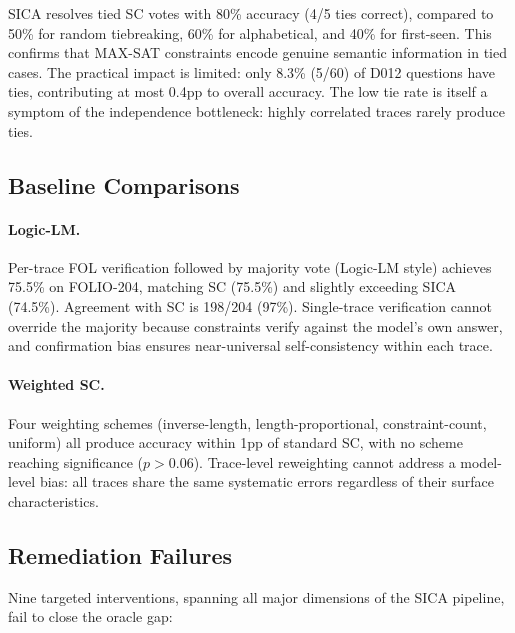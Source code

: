 \documentclass[11pt,a4paper]{article}
\begin{document}
SICA resolves tied SC votes with 80\% accuracy (4/5 ties correct), compared to 50\% for random tiebreaking, 60\% for alphabetical, and 40\% for first-seen. This confirms that MAX-SAT constraints encode genuine semantic information in tied cases. The practical impact is limited: only 8.3\% (5/60) of D012 questions have ties, contributing at most 0.4pp to overall accuracy. The low tie rate is itself a symptom of the independence bottleneck: highly correlated traces rarely produce ties.

\subsection{Baseline Comparisons}

\paragraph{Logic-LM.} Per-trace FOL verification followed by majority vote (Logic-LM style) achieves 75.5\% on FOLIO-204, matching SC (75.5\%) and slightly exceeding SICA (74.5\%). Agreement with SC is 198/204 (97\%). Single-trace verification cannot override the majority because constraints verify against the model's own answer, and confirmation bias ensures near-universal self-consistency within each trace.

\paragraph{Weighted SC.} Four weighting schemes (inverse-length, length-proportional, constraint-count, uniform) all produce accuracy within 1pp of standard SC, with no scheme reaching significance ($p > 0.06$). Trace-level reweighting cannot address a model-level bias: all traces share the same systematic errors regardless of their surface characteristics.

\subsection{Remediation Failures}
\label{sec:remediation}

Nine targeted interventions, spanning all major dimensions of the SICA pipeline, fail to close the oracle gap:
\end{document}
